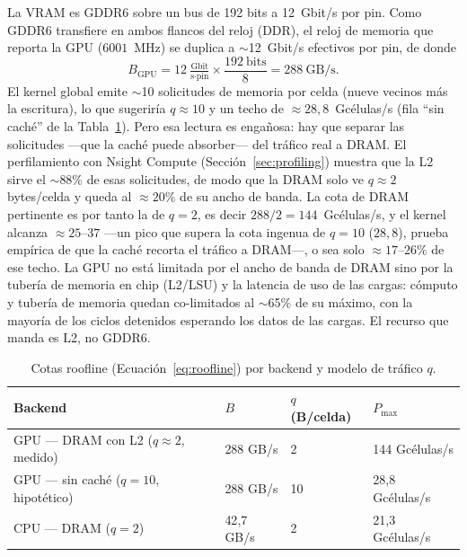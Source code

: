 \documentclass[
	spanish,
	letterpaper, oneside
]{article}
\begin{document}
La VRAM es GDDR6 sobre un bus de 192 bits a 12~Gbit/s por pin. Como GDDR6 transfiere
en ambos flancos del reloj (DDR), el reloj de memoria que reporta la GPU
($6001$~MHz) se duplica a $\sim$12~Gbit/s efectivos por pin, de donde
%
\begin{equation}
	B_{\text{GPU}} = 12\ \tfrac{\text{Gbit}}{\text{s}\cdot\text{pin}} \times
	\frac{192\ \text{bits}}{8} = 288\ \text{GB/s}.
	\label{eq:bw-gpu}
\end{equation}
%
El kernel global emite $\sim$10 solicitudes de memoria por celda (nueve vecinos
más la escritura), lo que sugeriría $q\approx10$ y un techo de $\approx28{,}8$~Gcélulas/s
(fila ``sin caché'' de la Tabla~\ref{tab:cotas}). Pero esa lectura es
engañosa: hay que separar las solicitudes ---que la caché puede absorber--- del
tráfico real a DRAM. El perfilamiento con Nsight Compute
(Sección~\ref{sec:profiling}) muestra que la L2 sirve el $\sim$88\% de esas
solicitudes, de modo que la DRAM solo ve $q\approx2$ bytes/celda y queda al
$\approx20\%$ de su ancho de banda. La cota de DRAM pertinente es por tanto la
de $q=2$, es decir $288/2 = 144$~Gcélulas/s, y el kernel alcanza $\approx25$--$37$
---un pico que supera la cota ingenua de $q{=}10$ ($28{,}8$), prueba empírica de
que la caché recorta el tráfico a DRAM---, o sea solo $\approx17$--$26\%$ de ese techo.
La GPU no está limitada por el ancho de
banda de DRAM sino por la tubería de memoria en chip (L2/LSU) y la latencia de uso de
las cargas: cómputo y tubería de memoria quedan co-limitados al $\sim$65\% de su
máximo, con la mayoría de los ciclos detenidos esperando los datos de las cargas. El
recurso que manda es L2, no GDDR6.

\begin{table}[H]
	\centering
	\caption{Cotas roofline (Ecuación~\ref{eq:roofline}) por backend y modelo
	de tráfico $q$.}
	\label{tab:cotas}
	\begin{tabular}{@{}llll@{}}
		\toprule
		Backend & $B$ & $q$ (B/celda) & $P_{\max}$ \\
		\midrule
		GPU --- DRAM con L2 ($q\approx2$, medido) & 288 GB/s    & 2  & 144 Gcélulas/s \\
		GPU --- sin caché ($q=10$, hipotético)    & 288 GB/s    & 10 & 28{,}8 Gcélulas/s \\
		CPU --- DRAM ($q=2$)                      & 42{,}7 GB/s & 2  & 21{,}3 Gcélulas/s \\
		\bottomrule
	\end{tabular}
\end{table}
\end{document}
